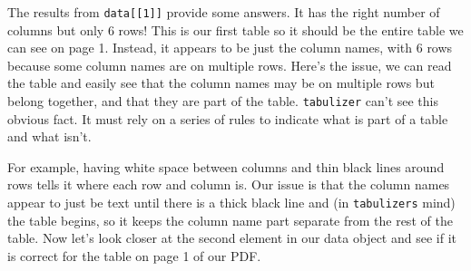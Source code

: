 \documentclass[
  a4paper,
]{krantz}
\begin{document}
The results from \texttt{data{[}{[}1{]}{]}} provide some
answers. It has the right number of columns but only 6 rows!
This is our first table so it should be the entire table we
can see on page 1. Instead, it appears to be just the column
names, with 6 rows because some column names are on multiple
rows. Here's the issue, we can read the table and easily see
that the column names may be on multiple rows but belong
together, and that they are part of the table.
\texttt{tabulizer} can't see this obvious fact. It must rely
on a series of rules to indicate what is part of a table and
what isn't.

For example, having white space between columns and thin
black lines around rows tells it where each row and column
is. Our issue is that the column names appear to just be
text until there is a thick black line and (in
\texttt{tabulizer\textquotesingle{}s} mind) the table
begins, so it keeps the column name part separate from the
rest of the table. Now let's look closer at the second
element in our data object and see if it is correct for the
table on page 1 of our PDF.
\end{document}
